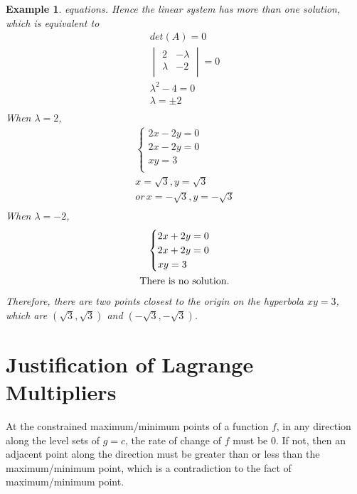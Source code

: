 \documentclass{article}
\newtheorem{example}{Example}
\begin{document}
\begin{example}
  equations. Hence the linear system has more than one solution, which is 
  equivalent to
  \begin{gather*}
    det(A) = 0 \\
    \begin{vmatrix}
      2 & -\lambda \\
      \lambda & -2 \\
    \end{vmatrix} = 0 \\
    \lambda^2 - 4 = 0 \\
    \lambda = \pm 2 \\
  \end{gather*}
  When $\lambda = 2$,
  \begin{gather*}
    \begin{cases}
      2x - 2y = 0 \\
      2x - 2y = 0 \\
      xy = 3 \\
    \end{cases}\\
    x = \sqrt{3}, y = \sqrt{3} \\
    or\, x = -\sqrt{3}, y = -\sqrt{3} \\
  \end{gather*}
  When $\lambda = -2$,
  \begin{gather*}
    \begin{cases}
      2x + 2y = 0 \\
      2x + 2y = 0 \\
      xy = 3 \\
    \end{cases} \\
    \textnormal{There is no solution.}
  \end{gather*}
  Therefore, there are two points closest to the origin on the hyperbola 
  $xy = 3$, which are $(\sqrt{3}, \sqrt{3})$ and $(-\sqrt{3}, -\sqrt{3})$.
\end{example}

\section{Justification of Lagrange Multipliers}

At the constrained maximum/minimum points of a function $f$, in any direction 
along the level sets of $g = c$, the rate of change of $f$ must be 0. If not, 
then an adjacent point along the direction must be greater than or less than the 
maximum/minimum point, which is a contradiction to the fact of maximum/minimum 
point.
\end{document}
